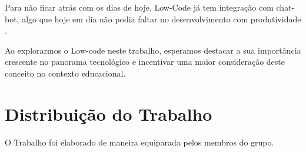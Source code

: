 \documentclass{article}
\begin{document}
\newline Para não ficar atrás com os dias de hoje, Low-Code já tem integração com chat-bot, algo que hoje em dia não podia faltar no desenvolvimento com produtividade \cite{7,8}.


\newline Ao explorarmos o Low-code neste trabalho, esperamos destacar a sua importância crescente no panorama tecnológico e incentivar uma maior consideração deste conceito no contexto educacional.

\section*{Distribuição do Trabalho}
\newline O Trabalho foi elaborado de maneira equiparada pelos membros do grupo.





\end{document}
